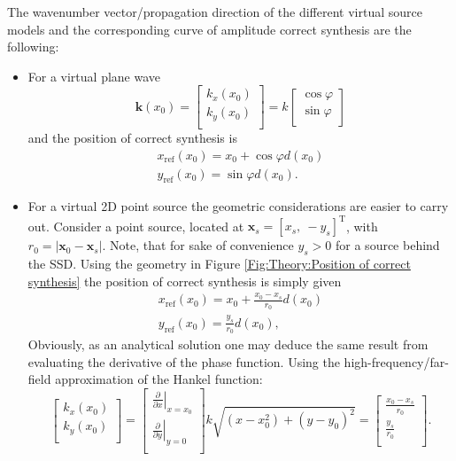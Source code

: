 \documentclass[12pt,a4paper]{article}
\newcommand{\sinfi}{\sin\varphi}
\newcommand{\cosfi}{\cos\varphi}
\newcommand{\vxo}{\mathbf{x}_0}
\begin{document}
The wavenumber vector/propagation direction of the different virtual source models and the corresponding curve of amplitude correct synthesis are the following:
\begin{itemize}
\item For a virtual plane wave 
\begin{equation}
\mathbf{k}(x_0) = \begin{bmatrix} k_x(x_0) \\[0.3em] k_y(x_0)\\[0.3em]    \end{bmatrix} =  k\begin{bmatrix} \cosfi \\[0.3em] \sinfi \\[0.3em]    \end{bmatrix}
\end{equation}
and the position of correct synthesis is 
\begin{eqnarray}
x_{\mathrm{ref}}(x_0) = x_0 + \cosfi d(x_0) \\
y_{\mathrm{ref}}(x_0) = \sinfi d(x_0).
\end{eqnarray}
\item For a virtual 2D point source the geometric considerations are easier to carry out. Consider a point source, located at $\mathbf{x}_s = [ x_s,\ -y_s ]^{\mathrm{T}}$, with $r_0 = | \vxo - \mathbf{x}_s |$. Note, that for sake of convenience $y_s>0$ for a source behind the SSD. Using the geometry in Figure \ref{Fig:Theory:Position of correct synthesis} the position of correct synthesis is simply given 
\begin{eqnarray}
x_{\mathrm{ref}}(x_0) = x_0 + \frac{x_0-x_s}{r_0} d(x_0) \\
y_{\mathrm{ref}}(x_0) = \frac{y_s}{r_0} d(x_0),
\label{Eq:Line_source_correcty_synth}
\end{eqnarray}
Obviously, as an analytical solution one may deduce the same result from evaluating the derivative of the phase function. Using the high-frequency/far-field approximation of the Hankel function:
\begin{equation} 
\begin{bmatrix} k_x(x_0) \\[0.3em] k_y(x_0)\\[0.3em]    \end{bmatrix} = 
\begin{bmatrix} 
\left. \frac{\partial}{\partial x} \right|_{x = x_0} 
\\[0.3em] 
\left. \frac{\partial}{\partial y} \right|_{y = 0} 
\\[0.3em]    \end{bmatrix} 
k\sqrt{(x-x_0^2) + (y-y_0)^2} = 
\begin{bmatrix} 
\frac{x_0- x_s}{r_0}
\\[0.3em] 
\frac{y_s}{r_0}
\\[0.3em]    \end{bmatrix} 
.
\end{equation}
\end{itemize}
\end{document}
